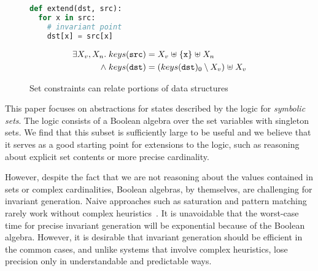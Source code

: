 \begin{figure}[tb]
  \newbox\exprogbox
  \begin{lrbox}{\exprogbox}
    \begin{minipage}[t][1cm][b]{0.4\textwidth}
      \begin{lstlisting}[language=python]
def extend(dst, src):
  for x in src:
    # invariant point
    dst[x] = src[x]
      \end{lstlisting}
    \end{minipage}
  \end{lrbox}
  \newbox\exproginv
  \begin{lrbox}{\exproginv}
    \begin{minipage}[t][0.9cm][b]{0.4\textwidth}
      \begin{align*}
        \exists X_v, X_n. \; keys(\texttt{src})
        & = X_v \mathrel{\uplus} \{\texttt{x}\} \mathrel{\uplus} X_n
        \\
        {} \mathrel{\wedge} keys(\texttt{dst})
        & = (keys(\texttt{dst})_0 \setminus X_v) \mathrel{\uplus} X_v
      \end{align*}
    \end{minipage}
  \end{lrbox}
  \centering
  \quad
  \caption{Set constraints can relate portions of data structures}
  \label{fig:intro-example} \label{f:1:intro}
\end{figure}

This paper focuses on abstractions for states described by the logic for \emph{symbolic sets}.  The logic consists of a Boolean algebra over the set variables with singleton sets. We find that this subset is sufficiently large to be useful and we
believe that it serves as a good starting point for extensions to the
logic, such as reasoning about explicit set contents or more precise
cardinality.

However, despite the fact that we are not reasoning about the values
contained in sets or complex cardinalities, Boolean algebras, by
themselves, are challenging for invariant generation.
Naive approaches such as saturation and pattern matching rarely work
without complex heuristics~\cite{fixbag:cav:11,ab:ecoop:13}.
It is unavoidable that the worst-case time for precise invariant
generation will be exponential because of the Boolean algebra.
However, it is desirable that invariant generation should be efficient
in the common cases, and unlike systems that involve complex heuristics,
lose precision only in understandable and predictable ways.


